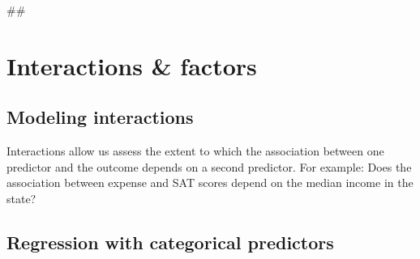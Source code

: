 \documentclass[]{book}
\newenvironment{Shaded}{\begin{snugshade}}{\end{snugshade}}
\newcommand{\KeywordTok}[1]{\textcolor[rgb]{0.13,0.29,0.53}{\textbf{#1}}}
\newcommand{\DataTypeTok}[1]{\textcolor[rgb]{0.13,0.29,0.53}{#1}}
\newcommand{\DecValTok}[1]{\textcolor[rgb]{0.00,0.00,0.81}{#1}}
\newcommand{\StringTok}[1]{\textcolor[rgb]{0.31,0.60,0.02}{#1}}
\newcommand{\CommentTok}[1]{\textcolor[rgb]{0.56,0.35,0.01}{\textit{#1}}}
\newcommand{\OperatorTok}[1]{\textcolor[rgb]{0.81,0.36,0.00}{\textbf{#1}}}
\newcommand{\NormalTok}[1]{#1}
\begin{document}
\begin{Shaded}
\begin{Highlighting}[]
\NormalTok{## }
\end{Highlighting}
\end{Shaded}

\section{Interactions \& factors}\label{interactions-factors}

\subsection{Modeling interactions}\label{modeling-interactions}

Interactions allow us assess the extent to which the association between
one predictor and the outcome depends on a second predictor. For
example: Does the association between expense and SAT scores depend on
the median income in the state?

\begin{Shaded}
\end{Shaded}

\subsection{Regression with categorical
predictors}\label{regression-with-categorical-predictors}
\end{document}
